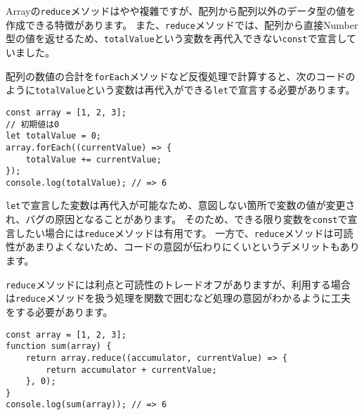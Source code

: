 Arrayの\texttt{reduce}メソッドはやや複雜ですが、配列から配列以外のデータ型の値を作成できる特徴があります。
また、\texttt{reduce}メソッドでは、配列から直接Number型の値を返せるため、\texttt{totalValue}という変数を再代入できない\texttt{const}で宣言していました。

配列の数値の合計を\texttt{forEach}メソッドなど反復処理で計算すると、次のコードのように\texttt{totalValue}という変数は再代入ができる\texttt{let}で宣言する必要があります。

\begin{lstlisting}
const array = [1, 2, 3];
// 初期値は0
let totalValue = 0;
array.forEach((currentValue) => {
    totalValue += currentValue;
});
console.log(totalValue); // => 6
\end{lstlisting}

\texttt{let}で宣言した変数は再代入が可能なため、意図しない箇所で変数の値が変更され、バグの原因となることがあります。
そのため、できる限り変数を\texttt{const}で宣言したい場合には\texttt{reduce}メソッドは有用です。
一方で、\texttt{reduce}メソッドは可読性があまりよくないため、コードの意図が伝わりにくいというデメリットもあります。

\texttt{reduce}メソッドには利点と可読性のトレードオフがありますが、利用する場合は\texttt{reduce}メソッドを扱う処理を関数で囲むなど処理の意図がわかるように工夫をする必要があります。

\begin{lstlisting}
const array = [1, 2, 3];
function sum(array) {
    return array.reduce((accumulator, currentValue) => {
        return accumulator + currentValue;
    }, 0);
}
console.log(sum(array)); // => 6
\end{lstlisting}

